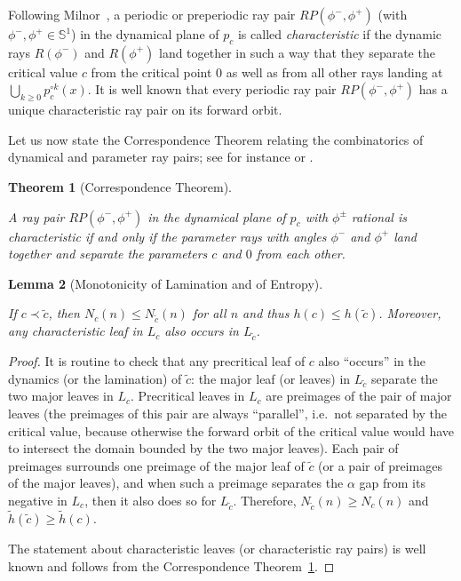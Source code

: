 \documentclass[12pt]{amsart}
\newcommand{\Circle}{\mathbb S^1}
\newcommand{\0}{\texttt{0}}
\newcommand{\1}{\texttt{1}}
\newtheorem{theorem}{Theorem}[section]
\newtheorem{lemma}[theorem]{Lemma}
\theoremstyle{definition}
\numberwithin{equation}{section}
\newcommand{\lineclear}{\rule{0pt}{2pt}\newline}
\begin{document}
Following Milnor~\cite{MiOrbits}, a periodic or preperiodic ray pair $RP(\phi^-,\phi^+)$ (with $\phi^-,\phi^+\in\Circle$) in the dynamical plane of $p_c$ is called \emph{characteristic} if the dynamic rays $R(\phi^-)$ and $R(\phi^+)$ land together in such a way that they separate the critical value $c$ from the critical point $0$ as well as from all other rays landing at $\bigcup_{k\ge 0}p_{c}^{\circ k}(x)$.
It is well known that every periodic ray pair $RP(\phi^-,\phi^+)$ has a unique characteristic ray pair on its forward orbit.


  Let us now state the Correspondence Theorem relating the combinatorics of dynamical and parameter ray pairs; see for instance \cite{MiOrbits} or \cite{MandelBranch}. 

\begin{theorem}[Correspondence Theorem]
\label{thm:Corresp} \lineclear
A ray pair $RP(\phi^-,\phi^+)$ in the dynamical plane of $p_c$ with $\phi^\pm$ rational  is characteristic if and only if the parameter rays with angles $\phi^-$ and $\phi^+$ land together and separate the parameters $c$ and $0$ from each other.
\end{theorem}



\begin{lemma}[Monotonicity of Lamination and of Entropy]
\label{Lem:Monotonicity} \lineclear
If $c\prec \tilde c$, then $N_c(n) \le N_{\tilde c}(n)$ for all $n$ and thus $h(c) \le h(\tilde c)$. Moreover, any characteristic leaf in $L_c$ also occurs in $L_{\tilde c}$. 
\end{lemma}
\begin{proof}
It is routine to check that any precritical leaf of $c$ also ``occurs'' in the dynamics (or the lamination) of $\tilde c$: the major leaf (or leaves) in $L_{\tilde c}$ separate the two major leaves in $L_c$. Precritical leaves in $L_{c}$ are preimages of the pair of major leaves (the preimages of this pair are always ``parallel'', i.e.\ not separated by the critical value, because otherwise the forward orbit of the critical value would have to intersect the domain bounded by the two major leaves). Each pair of preimages surrounds one preimage of the major leaf of $\tilde c$ (or a pair of preimages of the major leaves), and when such a preimage separates the $\alpha$ gap from its negative in $L_c$, then it also does so for $L_{\tilde c}$. Therefore, $N_{\tilde c}(n)\ge N_c(n)$ and $\tilde h(\tilde c)\ge \tilde h(c)$. 

The statement about characteristic leaves (or characteristic ray pairs) is well known and follows from the Correspondence Theorem~\ref{thm:Corresp}.
\end{proof}
\end{document}
